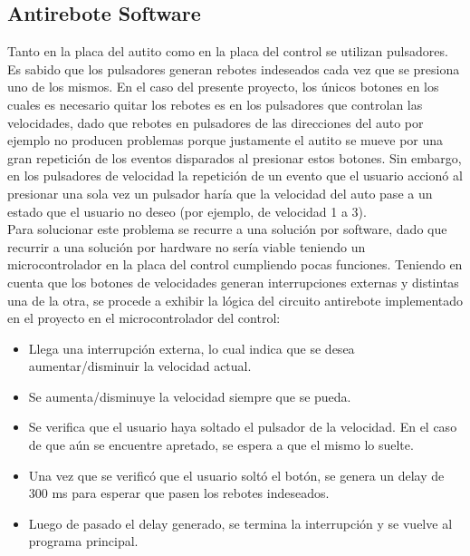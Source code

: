 \documentclass[a4paper,10pt]{article}
\begin{document}
		\subsection{Antirebote Software}
			Tanto en la placa del autito como en la placa del control se utilizan pulsadores. Es sabido que los pulsadores generan rebotes indeseados cada 
			vez que se presiona uno de los mismos. En el caso del presente proyecto, los únicos botones en los cuales es necesario quitar los rebotes es en 
			los pulsadores que controlan las velocidades, dado que rebotes en pulsadores de las direcciones del auto por ejemplo no producen problemas porque 
			justamente el autito 	se mueve por una gran repetición de los eventos disparados al presionar estos botones. Sin embargo, en los pulsadores de 
			velocidad la repetición de un evento que el usuario accionó al presionar una sola vez un pulsador haría que la velocidad del auto pase a un estado 
			que el usuario no deseo (por ejemplo, de velocidad 1 a 3).  \\
			\indent Para solucionar este problema se recurre a una solución por software, dado que recurrir a una solución por hardware no sería viable teniendo 
			un microcontrolador en la placa del control cumpliendo pocas funciones. Teniendo en cuenta que los botones de velocidades generan interrupciones 
			externas y distintas una de la otra, se procede a exhibir la lógica del circuito antirebote implementado en el proyecto en el microcontrolador del
			control:
			
			\begin{itemize}
				\item Llega una interrupción externa, lo cual indica que se desea aumentar/disminuir la velocidad actual.   
				\item Se aumenta/disminuye la velocidad siempre que se pueda.
				\item Se verifica que el usuario haya soltado el pulsador de la velocidad. En el caso de que aún se encuentre apretado, se espera a que el mismo lo 
				suelte.
				\item Una vez que se verificó que el usuario soltó el botón, se genera un delay de 300 ms para esperar que pasen los rebotes indeseados.
				\item Luego de pasado el delay generado, se termina la interrupción y se vuelve al programa principal.  
			\end{itemize}     
			
\end{document}
